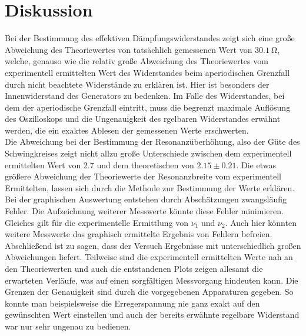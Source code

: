 \section{Diskussion}
Bei der Bestimmung des effektiven Dämpfungswiderstandes zeigt sich eine große Abweichung des Theoriewertes von tatsächlich gemessenen Wert
von $\SI{30.1}{\ohm}$, welche, genauso wie die relativ große Abweichung des Theoriewertes vom experimentell ermittelten Wert des Widerstandes
beim aperiodischen Grenzfall durch nicht beachtete Widerstände zu erklären ist. Hier ist besonders der Innenwiderstand des Generators zu bedenken.
Im Falle des Widerstandes, bei dem der aperiodische Grenzfall eintritt, muss die begrenzt maximale Auflösung des Oszilloskops und die Ungenauigkeit des rgelbaren
Widerstandes erwähnt werden, die ein exaktes Ablesen der gemessenen Werte erschwerten.\\
Die Abweichung bei der Bestimmung der Resonanzüberhöhung, also der Güte des Schwingkreises zeigt nicht allzu große Unterschiede zwischen dem experimentell ermittelten
Wert von 2.7 und dem theoretischen von $2.15 \pm 0.21$. Die etwas größere Abweichung der Theoriewerte der Resonanzbreite vom experimentell Ermittelten, lassen sich durch
die Methode zur Bestimmung der Werte erklären. Bei der graphischen Auswertung entstehen durch Abschätzungen zwangsläufig Fehler. Die Aufzeichnung weiterer Messwerte
könnte diese Fehler minimieren. Gleiches gilt für die experimentelle Ermittlung von $\nu_1$ und $\nu_2$. Auch hier könnten weitere Messwerte das graphisch ermittelte
Ergebnis von Fehlern befreien.
Abschließend ist zu sagen, dass der Versuch Ergebnisse mit unterschiedlich großen Abweichungen liefert. Teilweise sind die experimentell ermittelten Werte nah
an den Theoriewerten und auch die entstandenen Plots zeigen allesamt die erwarteten Verläufe, was auf einen sorgfältigen Messvorgang hindeuten kann.
Die Grenzen der Genauigkeit sind durch die vorgegebenen Apparaturen gegeben. So konnte man beispielsweise die Erregerspannung nie ganz exakt auf den gewünschten Wert
einstellen und auch der bereits erwähnte regelbare Widerstand war nur sehr ungenau zu bedienen.


\newpage
\nocite{*}
\printbibliography
